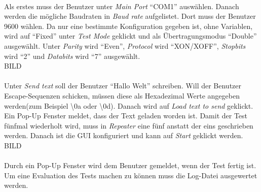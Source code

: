 \paragraph{}
Als erstes muss der Benutzer unter \textit{Main Port} "`COM1"' auswählen. Danach werden die mögliche Baudraten in \textit{Baud rate} aufgelistet. Dort muss der Benutzer 9600 wählen. Da nur eine bestimmte Konfiguration gegeben ist, ohne Variablen, wird auf "`Fixed"' unter \textit{Test Mode} geklickt und als Übertragungsmodus "`Double"' ausgewählt. Unter \textit{Parity} wird "`Even"', \textit{Protocol} wird "`XON/XOFF"', \textit{Stopbits} wird "`2"' und \textit{Databits} wird "`7"' ausgewählt.\\

BILD\\

\paragraph{}
Unter \textit{Send text} soll der Benutzer "`Hallo Welt"' schreiben. Will der Benutzer Escape-Sequenzen schicken, müssen diese als Hexadezimal Werte angegeben werden(zum Beispiel \textbackslash0a oder \textbackslash0d). Danach wird auf \textit{Load text to send} geklickt. Ein Pop-Up Fenster meldet, dass der Text geladen worden ist. Damit der Test fünfmal wiederholt wird, muss in \textit{Repeater} eine fünf anstatt der eins geschrieben werden. Danach ist die GUI konfiguriert und kann auf \textit{Start} geklickt werden.\\

BILD\\

\paragraph{}
Durch ein Pop-Up Fenster wird dem Benutzer gemeldet, wenn der Test fertig ist. Um eine Evaluation des Tests machen zu können muss die Log-Datei ausgewertet werden.

